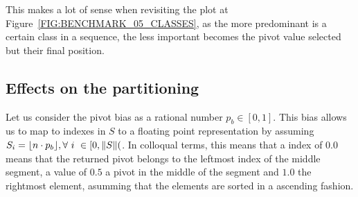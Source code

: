 This makes a lot of sense when revisiting the plot at Figure~\ref{FIG:BENCHMARK_05_CLASSES}, as the more predominant is a certain class in a sequence, the less important becomes the pivot value selected but their final position.\\

\subsection{Effects on the partitioning}

Let us consider the pivot bias as a rational number $p_b \in [0,1]$. This bias allows us to map to indexes in $S$ to a floating point representation by assuming $S_i = \lfloor n\cdot p_{b}  \rfloor, \forall ~i~ \in[0,\lVert S\rVert($. In colloqual terms, this means that a index of $0.0$ means that the returned pivot belongs to the leftmost index of the middle segment, a value of $0.5$ a pivot in the middle of the segment and $1.0$ the rightmost element, asumming that the elements are sorted in a ascending fashion.\\

